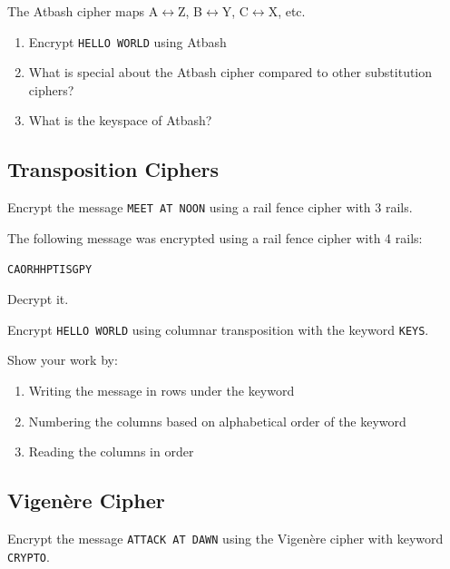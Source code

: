 \documentclass[11pt,a4paper]{report}
\begin{document}
\begin{ex}
The Atbash cipher maps A$\leftrightarrow$Z, B$\leftrightarrow$Y, C$\leftrightarrow$X, etc.

\begin{enumerate}[label=\alph*)]
    \item Encrypt \texttt{HELLO WORLD} using Atbash
    \item What is special about the Atbash cipher compared to other substitution ciphers?
    \item What is the keyspace of Atbash?
\end{enumerate}
\end{ex}

\subsection{Transposition Ciphers}

\begin{ex}
Encrypt the message \texttt{MEET AT NOON} using a rail fence cipher with 3 rails.
\end{ex}

\begin{ex}
The following message was encrypted using a rail fence cipher with 4 rails:

\texttt{CAORHHPTISGPY}

Decrypt it.
\end{ex}

\begin{ex}
Encrypt \texttt{HELLO WORLD} using columnar transposition with the keyword \texttt{KEYS}.

Show your work by:
\begin{enumerate}[label=\alph*)]
    \item Writing the message in rows under the keyword
    \item Numbering the columns based on alphabetical order of the keyword
    \item Reading the columns in order
\end{enumerate}
\end{ex}

\subsection{Vigenère Cipher}

\begin{ex}
Encrypt the message \texttt{ATTACK AT DAWN} using the Vigenère cipher with keyword \texttt{CRYPTO}.
\end{ex}
\end{document}
